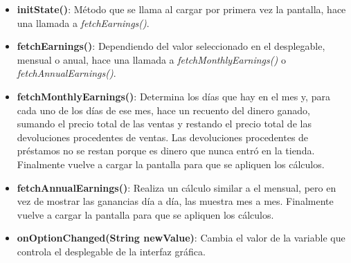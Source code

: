 \begin{itemize}
	\item \textbf{initState()}: Método que se llama al cargar por primera vez la pantalla, hace una llamada a \textit{fetchEarnings()}.
	\item \textbf{fetchEarnings()}: Dependiendo del valor seleccionado en el desplegable, mensual o anual, hace una llamada a \textit{fetchMonthlyEarnings()} o \textit{fetchAnnualEarnings()}.
	\item \textbf{fetchMonthlyEarnings()}: Determina los días que hay en el mes y, para cada uno de los días de ese mes, hace un recuento del dinero ganado, sumando el precio total de las ventas y restando el precio total de las devoluciones procedentes de ventas. Las devoluciones procedentes de préstamos no se restan porque es dinero que nunca entró en la tienda. Finalmente vuelve a cargar la pantalla para que se apliquen los cálculos.
	\item \textbf{fetchAnnualEarnings()}:  Realiza un cálculo similar a el mensual, pero en vez de mostrar las ganancias día a día, las muestra mes a mes. Finalmente vuelve a cargar la pantalla para que se apliquen los cálculos.
	\item \textbf{onOptionChanged(String newValue)}: Cambia el valor de la variable que controla el desplegable de la interfaz gráfica. 
\end{itemize}

